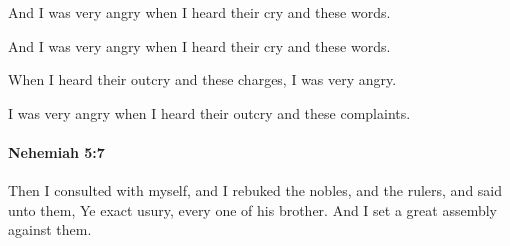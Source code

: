 			And I was very angry when I heard their cry and these words.

			\begin{versebox}
					\item[BHS] 
					\item[LXX] 
					\item[ASV] And I was very angry when I heard their cry and these words.
					\item[NIV] When I heard their outcry and these charges, I was very angry.
					\item[NRSV] I was very angry when I heard their outcry and these complaints.
			\end{versebox}

		\paragraph{Nehemiah 5:7} %
			\label{NEHEMIAH-5-7}

			Then I consulted with myself, and I rebuked the nobles, and the rulers, and said unto them, Ye exact usury, every one of his brother. And I set a great assembly against them.

